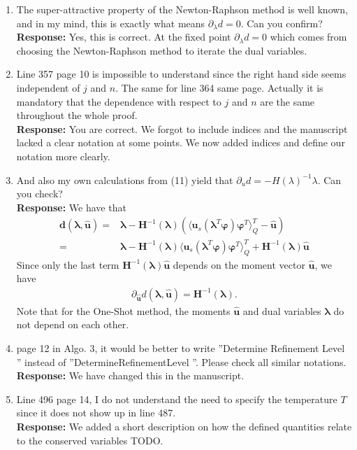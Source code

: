 \documentclass[11pt]{amsart}
\begin{document}
\begin{enumerate}
\item The super-attractive property of the Newton-Raphson method is well
known, and in my mind, this is exactly what means $\partial_{\lambda}d = 0$. Can you
confirm?
\\ \textbf{Response:} Yes, this is correct. At the fixed point $\partial_{\lambda}d = 0$ which comes from choosing the Newton-Raphson method to iterate the dual variables.
\item Line 357 page 10 is impossible to understand since the right hand side
seems independent of $j$ and $n$. The same for line 364 same page. Actually
it is mandatory that the dependence with respect to $j$ and $n$ are the same
throughout the whole proof.
\\ \textbf{Response:} You are correct. We forgot to include indices and the manuscript lacked a clear notation at some points. We now added indices and define our notation more clearly. 
\item And also my own calculations from (11) yield that $\partial_u d = -H(\lambda)^{-1}\lambda$. Can you check?
\\ \textbf{Response:} We have that
\begin{align*}
\bm d(\bm{\lambda},\bm{\hat u}) =& \bm{\lambda} - \bm{H}^{-1}(\bm\lambda)\left(\langle \bm u_s(\bm{\lambda}^T \bm\varphi)\bm\varphi^T\rangle_Q^T - \bm{\hat u}\right) \\
=& \bm{\lambda} - \bm{H}^{-1}(\bm\lambda)\langle \bm u_s(\bm{\lambda}^T \bm\varphi)\bm\varphi^T\rangle_Q^T +\bm{H}^{-1}(\bm\lambda) \bm{\hat u}
\end{align*}
Since only the last term $\bm{H}^{-1}(\bm\lambda) \bm{\hat u}$ depends on the moment vector $\bm{\hat u}$, we have
\begin{align*}
\partial_{\bm{\hat u}} d(\bm{\lambda},\bm{\hat u}) = \bm{H}^{-1}(\bm\lambda).
\end{align*}
Note that for the One-Shot method, the moments $\bm{\hat u}$ and dual variables $\bm\lambda$ do not depend on each other.  
\item page 12 in Algo. 3, it would be better to write ”Determine Refinement
Level ” instead of ”DetermineRefinementLevel ”. Please check all similar
notations.
\\ \textbf{Response:} We have changed this in the manuscript.
\item Line 496 page 14, I do not understand the need to specify the temperature $T$ since it does not show up in line 487.
\\ \textbf{Response:} We added a short description on how the defined quantities relate to the conserved variables TODO.

\end{enumerate}
\end{document}
